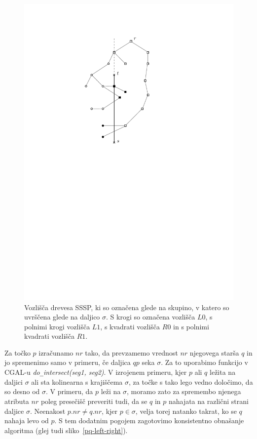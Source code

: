 \documentclass[a4paper, 12pt]{book}
\newcommand{\U}{\texttt{\_}}
\begin{document}
\begin{figure}[htp]
\centerline{\includegraphics{pics/categorization.pdf}}
\caption{Vozlišča drevesa SSSP, ki so označena glede na skupino, v katero so uvrščena glede na daljico $\sigma$. S krogi so označena vozlišča $L0$, s polnimi krogi vozlišča $L1$, s kvadrati vozlišča $R0$ in s polnimi kvadrati vozlišča $R1$. }
\label{categorization}
\end{figure}

Za točko $p$ izračunamo $nr$ tako, da prevzamemo vrednost $nr$ njegovega starša $q$ in jo spremenimo samo v primeru, če daljica $qp$ seka $\sigma$. Za to uporabimo funkcijo v CGAL-u \textit{do\U intersect(seg1, seg2)}. V izrojenem primeru, kjer $p$ ali $q$ ležita na daljici $\sigma$ ali sta kolinearna s krajiščema $\sigma$, za točke s tako lego vedno določimo, da so desno od $\sigma$.  V primeru, da $p$ leži na $\sigma$, moramo zato za spremembo njenega atributa $nr$ poleg presečišč preveriti tudi, da se $q$ in $p$ nahajata na različni strani daljice $\sigma$. Neenakost $p.nr\neq q.nr$, kjer $p\in \sigma$, velja torej natanko takrat, ko se $q$ nahaja levo od $p$. S tem dodatnim pogojem zagotovimo konsistentno obnašanje algoritma (glej tudi sliko~\ref{pq-left-right}).
\end{document}
